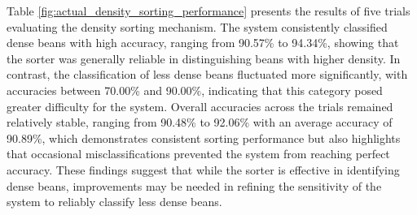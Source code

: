 Table \ref{fig:actual_density_sorting_performance} presents the results of five trials evaluating the density sorting mechanism. The system consistently classified dense beans with high accuracy, ranging from 90.57\% to 94.34\%, showing that the sorter was generally reliable in distinguishing beans with higher density. In contrast, the classification of less dense beans fluctuated more significantly, with accuracies between 70.00\% and 90.00\%, indicating that this category posed greater difficulty for the system. Overall accuracies across the trials remained relatively stable, ranging from 90.48\% to 92.06\% with an average accuracy of 90.89\%, which demonstrates consistent sorting performance but also highlights that occasional misclassifications prevented the system from reaching perfect accuracy. These findings suggest that while the sorter is effective in identifying dense beans, improvements may be needed in refining the sensitivity of the system to reliably classify less dense beans.


